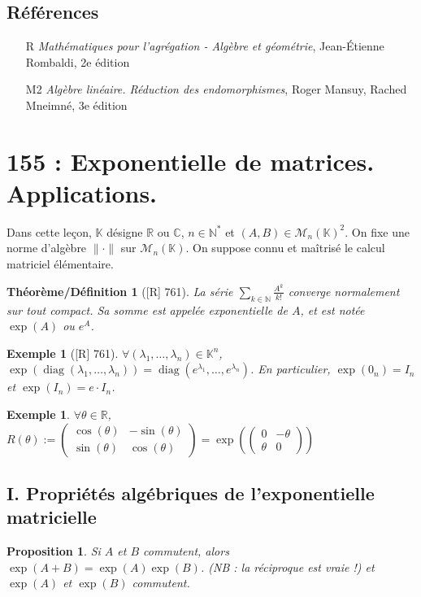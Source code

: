 \documentclass[10pt, a4paper, parskip=full, twoside, twocolumn]{report}
\newtheorem{theorem_def}[definition]{Théorème/Définition}
\newtheorem{proposition}[definition]{Proposition}
\newtheorem{example}[definition]{Exemple}
\newcommand{\IN}{\mathbb{N}}
\newcommand{\IK}{\mathbb{K}}
\newcommand{\IC}{\mathbb{C}}
\newcommand{\IR}{\mathbb{R}}
\DeclareMathOperator{\diag}{diag}
\begin{document}
\section*{Références}
\begin{itemize}
	\item[R] \emph{Mathématiques pour l'agrégation - Algèbre et géométrie}, Jean-Étienne Rombaldi, 2e édition
	\item[M2] \emph{Algèbre linéaire. Réduction des endomorphismes}, Roger Mansuy, Rached Mneimné, 3e édition
\end{itemize}




\chapter*{155 : Exponentielle de matrices. Applications.}
\setcounter{definition}{0}

\textcolor{paragraphtext}{Dans cette leçon, $\IK$ désigne $\IR$ ou $\IC$, $n\in \IN^*$
et $(A,B)\in\mathcal{M}_n(\IK)^2$. On fixe une norme d'algèbre $\|\cdot\|$ sur $\mathcal{M}_n(\IK)$.
On suppose connu et maîtrisé le calcul matriciel élémentaire.}

\begin{theorem_def}[\textnormal{[R] 761}]
	La série $\sum_{k\in\IN} \frac{A^k}{k!}$ converge normalement sur 
	tout compact. Sa somme est appelée \emph{exponentielle de $A$}, et est notée $\exp(A)$ ou $e^A$.
\end{theorem_def}

\begin{example}[\textnormal{[R] 761}]
	$\forall (\lambda_1,\dots,\lambda_n)\in\IK^n$, $\exp(\diag(\lambda_1,\dots,\lambda_n)) = \diag(e^{\lambda_1},\dots,e^{\lambda_n})$.
	En particulier, $\exp(0_n) = I_n$ et $\exp(I_n) = e\cdot I_n$.
\end{example}

\begin{example}
	$\forall \theta\in\IR$, $R(\theta) := \begin{pmatrix}
		\cos(\theta) & -\sin(\theta) \\ \sin(\theta) & \cos(\theta)
	\end{pmatrix} = \exp\left(\begin{pmatrix}
		0 & -\theta \\ \theta & 0
	\end{pmatrix}\right)$
\end{example}

\section*{I. Propriétés algébriques de l'exponentielle matricielle}
\begin{proposition}
	Si $A$ et $B$ commutent, alors $\exp(A+B) = \exp(A)\exp(B)$.
	(NB : la réciproque est vraie !) et $\exp(A)$ et $\exp(B)$ commutent.
\end{proposition}
\end{document}
